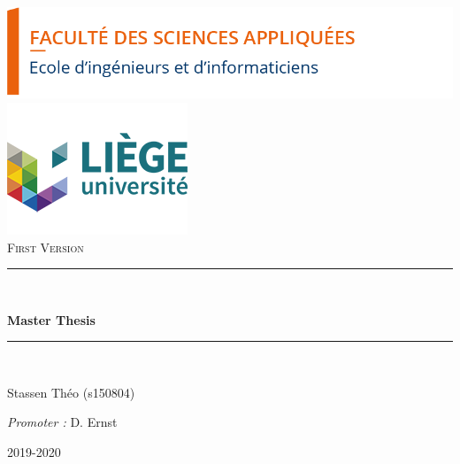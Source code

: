 \documentclass[a4paper, 12pt]{article}
\newcommand{\HRule}{\rule{\linewidth}{0.5mm}}
\begin{document}
\begin{titlepage}

  	\begin{center} 

	
    \includegraphics[scale=0.35]{logo_fsa.png}  %
    \includegraphics[scale=0.6]{logo_Ulg.png}\\[1.15cm]
   		\textsc{\Large First Version}\\[1.2cm]

    	\HRule 
    	\\[0.4cm]
    	{\bfseries \LARGE     Master Thesis
    	\\[0.4cm] 

    	\HRule} \\[2cm]
    	

  
 
    \begin{minipage}{0.4\textwidth}
      \begin{flushleft} \large
         Stassen Théo (s150804)
      \end{flushleft}
    \end{minipage}
    \begin{minipage}{0.4\textwidth}
      \begin{flushright} \large
        \emph{Promoter :} D. Ernst \\      
      \end{flushright}
    \end{minipage}

    \vfill

    \large 2019-2020

  \end{center}
\end{titlepage}
\end{document}
